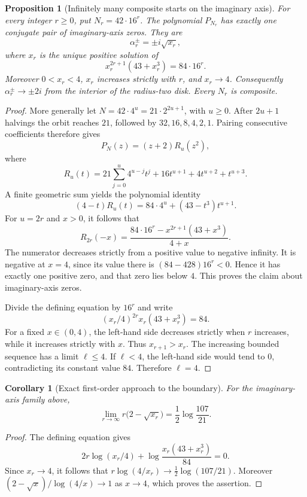 \documentclass[11pt,a4paper]{article}
\newtheorem{proposition}[theorem]{Proposition}
\newtheorem{corollary}[theorem]{Corollary}
\theoremstyle{definition}
\theoremstyle{remark}
\numberwithin{equation}{section}
\begin{document}
\begin{proposition}[Infinitely many composite starts on the imaginary axis]
For every integer $r\geq0$, put $N_r=42\cdot16^r$. The polynomial $P_{N_r}$
has exactly one conjugate pair of imaginary-axis zeros. They are
\[
 \alpha_r^\pm=\pm i\sqrt{x_r},
\]
where $x_r$ is the unique positive solution of
\[
 x_r^{2r+1}(43+x_r^3)=84\cdot16^r.
\]
Moreover $0<x_r<4$, $x_r$ increases strictly with $r$, and $x_r\longrightarrow4$.
Consequently $\alpha_r^\pm\longrightarrow\pm2i$ from the interior of the
radius-two disk. Every $N_r$ is composite.
\end{proposition}
\begin{proof}
More generally let $N=42\cdot4^u=21\cdot2^{2u+1}$, with $u\geq0$.
After $2u+1$ halvings the orbit reaches $21$, followed by
$32,16,8,4,2,1$. Pairing consecutive coefficients therefore gives
\[
 P_N(z)=(z+2)R_u(z^2),
\]
where
\[
 R_u(t)=21\sum_{j=0}^{u}4^{u-j}t^j
       +16t^{u+1}+4t^{u+2}+t^{u+3}.
\]
A finite geometric sum yields the polynomial identity
\[
 (4-t)R_u(t)=84\cdot4^u+(43-t^3)t^{u+1}.
\]
For $u=2r$ and $x>0$, it follows that
\[
 R_{2r}(-x)=
 \frac{84\cdot16^r-x^{2r+1}(43+x^3)}{4+x}.
\]
The numerator decreases strictly from a positive value to negative infinity.
It is negative at $x=4$, since its value there is
$(84-428)16^r<0$. Hence it has exactly one positive zero, and that zero
lies below $4$. This proves the claim about imaginary-axis zeros.

Divide the defining equation by $16^r$ and write
\[
 (x_r/4)^{2r}x_r(43+x_r^3)=84.
\]
For a fixed $x\in(0,4)$, the left-hand side decreases strictly when $r$
increases, while it increases strictly with $x$. Thus $x_{r+1}>x_r$.
The increasing bounded sequence has a limit $\ell\leq4$. If $\ell<4$,
the left-hand side would tend to $0$, contradicting its constant value
$84$. Therefore $\ell=4$.
\end{proof}

\begin{corollary}[Exact first-order approach to the boundary]
For the imaginary-axis family above,
\[
 \lim_{r\to\infty}r\bigl(2-\sqrt{x_r}\bigr)
   =\frac12\log\frac{107}{21}.
\]
\end{corollary}
\begin{proof}
The defining equation gives
\[
 2r\log(x_r/4)+\log\frac{x_r(43+x_r^3)}{84}=0.
\]
Since $x_r\to4$, it follows that
$r\log(4/x_r)\to\tfrac12\log(107/21)$.
Moreover $(2-\sqrt{x})/\log(4/x)\to1$ as $x\to4$,
which proves the assertion.
\end{proof}
\end{document}
